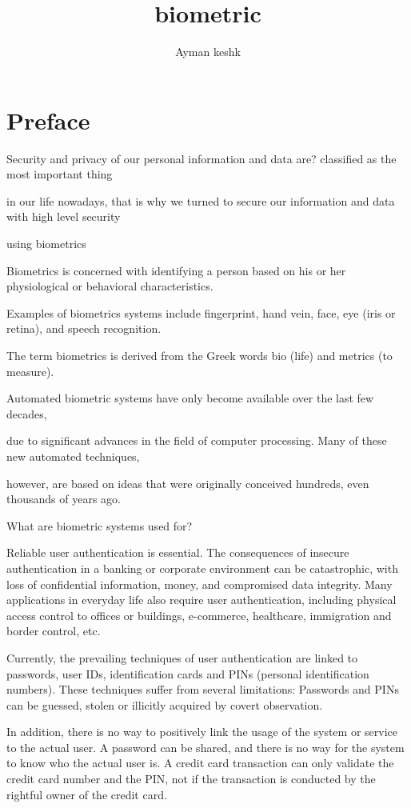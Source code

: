 \documentclass [12pt]{book}
\author{Ayman keshk}
\begin{document}
\title{biometric }
	\maketitle
	 \tableofcontents 
	\chapter*{Preface}
	Security and privacy of our personal information and data are? classified as the most important thing 

in our life nowadays, that is why we turned to secure our information and data with high level security 

using biometrics

Biometrics is concerned with identifying a person based on his or her physiological or behavioral characteristics. 

Examples of biometrics systems include fingerprint, hand vein, face, eye (iris or retina), and speech recognition.



The term biometrics is derived from the Greek words bio (life) and metrics (to measure).

Automated biometric systems have only become available over the last few decades,

due to significant advances in the field of computer processing. Many of these new automated techniques,

however, are based on ideas that were originally conceived hundreds, even thousands of years ago.


What are biometric systems used for?


Reliable user authentication is essential. The consequences of insecure authentication in a banking or corporate environment can be catastrophic, with loss of confidential information, money, and compromised data integrity. Many applications in everyday life also require user authentication, including physical access control to offices or buildings, e-commerce, healthcare, immigration and border control, etc.


Currently, the prevailing techniques of user authentication are linked to passwords, user IDs, identification cards and PINs (personal identification numbers). These techniques suffer from several limitations: Passwords and PINs can be guessed, stolen or illicitly acquired by covert observation.


In addition, there is no way to positively link the usage of the system or service to the actual user. A password can be shared, and there is no way for the system to know who the actual user is. A credit card transaction can only validate the credit card number and the PIN, not if the transaction is conducted by the rightful owner of the credit card.
\end{document}
